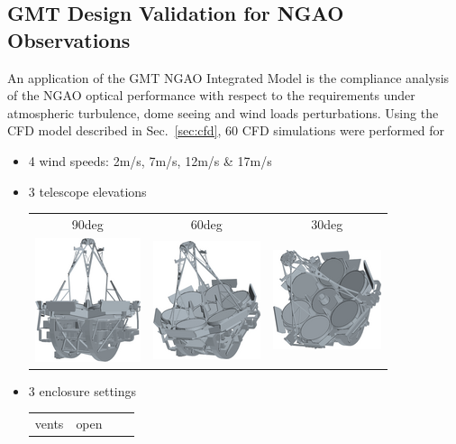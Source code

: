 \documentclass[]{AO4ELT}  %
\begin{document}
\clearpage

\subsection{GMT Design Validation for NGAO Observations}
\label{sec:gmt-ngao-vv}

An application of the GMT NGAO Integrated Model is the compliance analysis of the NGAO optical performance with respect to the requirements under atmospheric turbulence, dome seeing and wind loads perturbations.
Using the CFD model described in Sec.~\ref{sec:cfd}, 60 CFD simulations were performed for
\begin{itemize}
   \item 4 wind speeds: 2m/s, 7m/s, 12m/s \& 17m/s
   \item 3 telescope elevations
         \begin{tabular}{ccc}
            90deg                                                             & 60deg & 30deg \\
            \includegraphics[width=0.2\linewidth]{zen00az000_OS7_tel_tr.png}  &
            \includegraphics[width=0.2\linewidth]{zen30az000_CD12_tel_tr.png} &
            \includegraphics[width=0.2\linewidth]{zen60az000_CS17_tel_tr.png}
         \end{tabular}
   \item 3 enclosure settings
         \begin{tabular}{cccc}
            vents                                                         & open                                                         &

\end{tabular}
\end{itemize}
\end{document}
